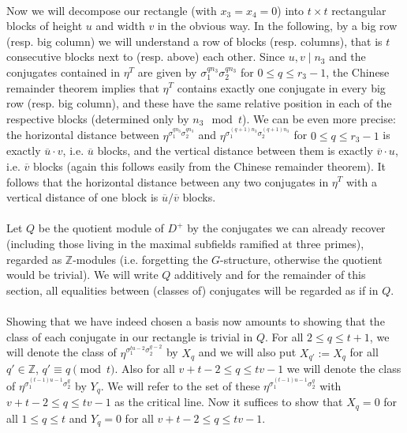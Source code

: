 \documentclass[12pt,a4paper]{article}
\newcommand{\Z}{\mathbb{Z}}
\newcommand{\uo}{\overline{u}}
\newcommand{\vo}{\overline{v}}
\begin{document}
\paragraph*{}
Now we will decompose our rectangle (with $x_3=x_4=0$) into $t\times t$ rectangular blocks of height $u$ and width $v$ in the obvious way. In the following, by a big row (resp. big column) we will understand a row of blocks (resp. columns), that is $t$ consecutive blocks next to (resp. above) each other. Since $u,v\mid n_3$ and the conjugates contained in $\eta^T$ are given by $\sigma_1^{qn_3}\sigma_2^{qn_3}$ for $0\leq q \leq r_3-1$, the Chinese remainder theorem implies that $\eta^T$ contains exactly one conjugate in every big row (resp. big column), and these have the same relative position in each of the respective blocks (determined only by $n_3 \mod t$). We can be even more precise: the horizontal distance between $\eta^{\sigma_1^{qn_3}\sigma_2^{qn_3}}$ and $\eta^ {\sigma_1^{(q+1)n_3}\sigma_2^{(q+1)n_3}}$ for $0\leq q \leq r_3-1$ is exactly $\uo\cdot v$, i.e. $\uo$ blocks, and the vertical distance between them is exactly $\vo\cdot u$, i.e. $\vo$ blocks (again this follows easily from the Chinese remainder theorem). It follows that the horizontal distance between any two conjugates in $\eta^T$ with a vertical distance of one block is $\uo/\vo$ blocks.
\paragraph*{}
Let $Q$ be the quotient module of $D^+$ by the conjugates we can already recover (including those living in the maximal subfields ramified at three primes), regarded as $\Z$-modules (i.e. forgetting the $G$-structure, otherwise the quotient would be trivial). We will write $Q$ additively and for the remainder of this section, all equalities between (classes of) conjugates will be regarded as if in $Q$.
\paragraph*{}
Showing that we have indeed chosen a basis now amounts to showing that the class of each conjugate in our rectangle is trivial in $Q$. For all $2\leq q\leq t+1$, we will denote the class of $\eta^{\sigma_1^{tu-2}\sigma_2^{q-2}}$ by $X_q$ and we will also put $X_{q'}:=X_q$ for all $q'\in\Z$, $q'\equiv q\pmod{t}$. Also for all $v+t-2\leq q\leq tv-1$ we will denote the class of $\eta^{\sigma_1^{(t-1)u-1}\sigma_2^q}$ by $Y_q$. We will refer to the set of these $\eta^{\sigma_1^{(t-1)u-1}\sigma_2^q}$ with $v+t-2\leq q\leq tv-1$ as the critical line. Now it suffices to show that $X_q=0$ for all $1\leq q\leq t$ and $Y_q=0$ for all $v+t-2\leq q\leq tv-1$.
\end{document}
